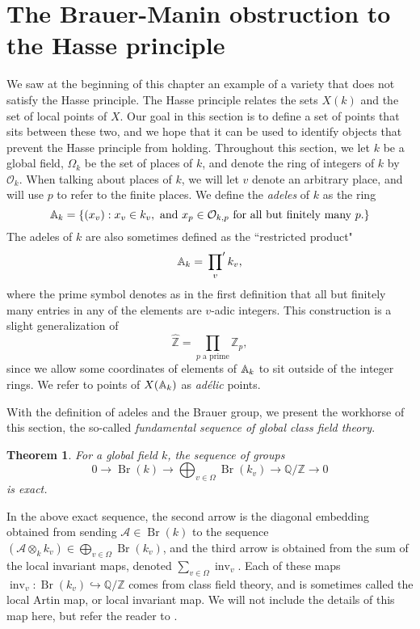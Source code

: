 \documentclass[12pt,twoside]{reedthesis}
\theoremstyle{plain}
\newtheorem{theorem}{Theorem}[chapter]
\theoremstyle{definition}
\theoremstyle{remark}
\newcommand{\ZZ}{\mathbb{Z}}
\newcommand{\Affine}{\mathbb{A}}
\newcommand{\QQ}{\mathbb{Q}}
\newcommand{\calA}{\mathcal{A}}
\newcommand{\calO}{\mathcal{O}}
\newcommand{\Br}{\operatorname{Br}}
\newcommand{\adele}{\reflectbox{$\Affine$}}
\newcommand{\inv}{\operatorname{inv}}
\begin{document}
\section{The Brauer-Manin obstruction to the Hasse principle}
We saw at the beginning of this chapter an example of a variety that does not satisfy the Hasse principle. The Hasse principle relates the sets $X(k)$ and the set of local points of $X$. Our goal in this section is to define a set of points that sits between these two, and we hope that it can be used to identify objects that prevent the Hasse principle from holding.
Throughout this section, we let $k$ be a global field, $\Omega_k$ be the set of places of $k$, and denote the ring of integers of $k$ by $\calO_k$. When talking about places of $k$, we will let $v$ denote an arbitrary place, and will use $p$ to refer to the finite places. We define the \emph{adeles} of $k$ as the ring
\[
\adele_k=\{(x_v):x_v\in k_v,\text{ and } x_p\in\calO_{k,p}\text{ for all but finitely many $p$.}\}
\]
The adeles of $k$ are also sometimes defined as the ``restricted product"
\[
\adele_k=\sideset{}{^\prime}\prod_v k_v,
\]
where the prime symbol denotes as in the first definition that all but finitely many entries in any of the elements are $v$-adic integers. This construction is a slight generalization of 
\[
\hat{\ZZ}=\prod_{p\text{ a prime}}\ZZ_p,
\] 
since we allow some coordinates of elements of $\adele_k$ to sit outside of the integer rings. We refer to points of $X(\adele_k)$ as \emph{ad\'elic} points.

With the definition of adeles and the Brauer group, we present the workhorse of this section, the so-called \emph{fundamental sequence of global class field theory}.
\begin{theorem} For a global field $k$, the sequence of groups
\[
0\longrightarrow \Br(k)\longrightarrow \bigoplus_{v\in\Omega}\Br(k_v)\longrightarrow \QQ/\ZZ\longrightarrow0
\]
is exact.\label{sequence}
\end{theorem}
\noindent In the above exact sequence, the second arrow is the diagonal embedding obtained from sending $\calA\in\Br(k)$ to the sequence $(\calA\otimes_k k_v)\in\bigoplus_{v\in\Omega}\Br(k_v)$, and the third arrow is obtained from the sum of the local invariant maps, denoted $\sum_{v\in\Omega} \inv_v$. Each of these maps $\inv_v:\Br(k_v)\hookrightarrow\QQ/\ZZ$ comes from class field theory, and is sometimes called the local Artin map, or local invariant map. We will not include the details of this map here, but refer the reader to \cite{milneCFT}.
\end{document}
